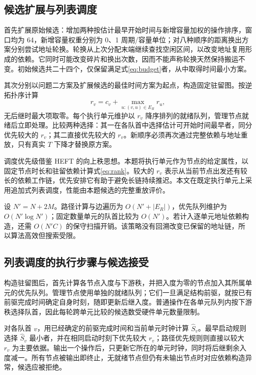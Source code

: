 \subsection{候选扩展与列表调度}
首先扩展原始候选：增加两种按估计最早开始时间与新增容量加权的操作排序，窗口均为 64，新增容量权重分别为 0、1 周期/容量单位；对八种顺序的距离换出方案分别尝试地址轮换。轮换从上次分配末端继续查找空闲区间，以改变地址复用形成的依赖。它同时可能改变碎片和换出次数，因而不能声称轮换天然保持搬运不变。初始候选共二十四个，仅保留满足式\eqref{eq:budget}者，从中取得时间最小方案。

其次分别以问题二方案及扩展候选的最佳时间方案为起点，构造固定驻留图。按逆拓扑序计算
\begin{equation}
r_v=c_v+\max_{u:(v,u)\in E_R}r_u,\label{eq:rank}
\end{equation}
无后继时最大项取零。每个执行单元维护以 $r_v$ 降序排列的就绪队列，管理节点就绪后立即处理。比较两种选择：其一在各队首中选择估计可开始时间最早者，同分优先较大的 $r_v$；其二直接优先较大的 $r_v$。新顺序必须再次通过完整依赖与地址重放，只有真实 $T$ 下降才替换原方案。

调度优先级借鉴 HEFT 的向上秩思想\cite{heft}。本题将执行单元作为节点的给定属性，以固定节点时长和驻留依赖计算式\eqref{eq:rank}。较大的 $r_v$ 表示从当前节点出发还有较长的依赖工作链，优先安排它有助于避免长链持续推迟。本文在既定执行单元上采用追加式列表调度，性能由本题候选的完整重放评价。

设 $N'=N+2M$。路径计算与边遍历为 $O(N'+|E_R|)$，优先队列维护为 $O(N'\log N')$；固定数量单元的队首比较为 $O(N')$。若计入逐单元地址依赖构造，还需 $O(N'C)$ 的保守扫描开销。该策略没有回溯改变已保留的地址链，所以算法高效但搜索受限。

\subsection{列表调度的执行步骤与候选接受}
构造驻留图后，首先计算各节点入度与下游秩，并把入度为零的节点加入其所属单元的优先队列。管理节点使用单独的就绪队列；它们一旦满足结构前驱，就按已有前驱完成时间确定自身时刻，随即更新后继入度。普通操作在各单元队列内按下游秩选择队首，因此每轮跨单元比较的候选数受硬件单元数量限制。

对各队首 $v$，用已经确定的前驱完成时间和当前单元时钟计算 $\widehat S_v$。最早启动规则选择 $\widehat S_v$ 最小者，并在相同启动时刻下优先较大 $r_v$；路径优先规则则直接以较大 $r_v$ 为主要依据。输出一个操作后，只更新它所在的单元时钟，同时将后继剩余入度减一。所有节点被输出即终止，无就绪节点但仍有未输出节点时对应依赖构造异常，候选应被拒绝。

